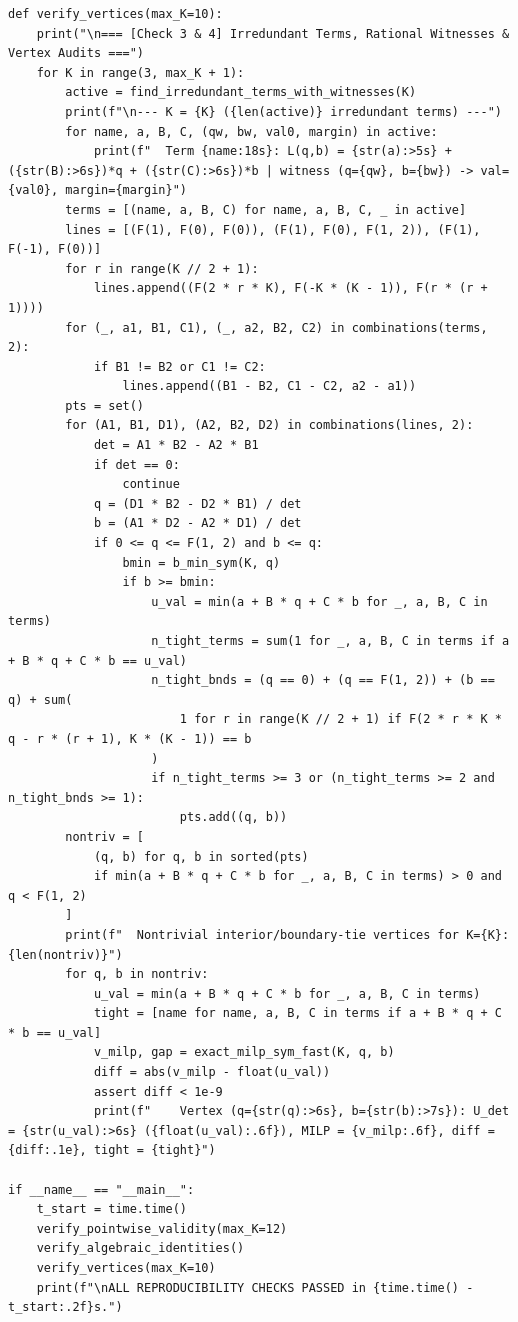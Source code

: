 \documentclass[11pt,a4paper]{article}
\theoremstyle{definition}
\theoremstyle{remark}
\begin{document}
\begin{lstlisting}
def verify_vertices(max_K=10):
    print("\n=== [Check 3 & 4] Irredundant Terms, Rational Witnesses & Vertex Audits ===")
    for K in range(3, max_K + 1):
        active = find_irredundant_terms_with_witnesses(K)
        print(f"\n--- K = {K} ({len(active)} irredundant terms) ---")
        for name, a, B, C, (qw, bw, val0, margin) in active:
            print(f"  Term {name:18s}: L(q,b) = {str(a):>5s} + ({str(B):>6s})*q + ({str(C):>6s})*b | witness (q={qw}, b={bw}) -> val={val0}, margin={margin}")
        terms = [(name, a, B, C) for name, a, B, C, _ in active]
        lines = [(F(1), F(0), F(0)), (F(1), F(0), F(1, 2)), (F(1), F(-1), F(0))]
        for r in range(K // 2 + 1):
            lines.append((F(2 * r * K), F(-K * (K - 1)), F(r * (r + 1))))
        for (_, a1, B1, C1), (_, a2, B2, C2) in combinations(terms, 2):
            if B1 != B2 or C1 != C2:
                lines.append((B1 - B2, C1 - C2, a2 - a1))
        pts = set()
        for (A1, B1, D1), (A2, B2, D2) in combinations(lines, 2):
            det = A1 * B2 - A2 * B1
            if det == 0:
                continue
            q = (D1 * B2 - D2 * B1) / det
            b = (A1 * D2 - A2 * D1) / det
            if 0 <= q <= F(1, 2) and b <= q:
                bmin = b_min_sym(K, q)
                if b >= bmin:
                    u_val = min(a + B * q + C * b for _, a, B, C in terms)
                    n_tight_terms = sum(1 for _, a, B, C in terms if a + B * q + C * b == u_val)
                    n_tight_bnds = (q == 0) + (q == F(1, 2)) + (b == q) + sum(
                        1 for r in range(K // 2 + 1) if F(2 * r * K * q - r * (r + 1), K * (K - 1)) == b
                    )
                    if n_tight_terms >= 3 or (n_tight_terms >= 2 and n_tight_bnds >= 1):
                        pts.add((q, b))
        nontriv = [
            (q, b) for q, b in sorted(pts)
            if min(a + B * q + C * b for _, a, B, C in terms) > 0 and q < F(1, 2)
        ]
        print(f"  Nontrivial interior/boundary-tie vertices for K={K}: {len(nontriv)}")
        for q, b in nontriv:
            u_val = min(a + B * q + C * b for _, a, B, C in terms)
            tight = [name for name, a, B, C in terms if a + B * q + C * b == u_val]
            v_milp, gap = exact_milp_sym_fast(K, q, b)
            diff = abs(v_milp - float(u_val))
            assert diff < 1e-9
            print(f"    Vertex (q={str(q):>6s}, b={str(b):>7s}): U_det = {str(u_val):>6s} ({float(u_val):.6f}), MILP = {v_milp:.6f}, diff = {diff:.1e}, tight = {tight}")

if __name__ == "__main__":
    t_start = time.time()
    verify_pointwise_validity(max_K=12)
    verify_algebraic_identities()
    verify_vertices(max_K=10)
    print(f"\nALL REPRODUCIBILITY CHECKS PASSED in {time.time() - t_start:.2f}s.")
\end{lstlisting}
\end{document}

